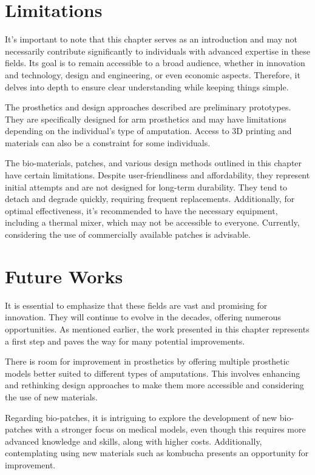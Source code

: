 \section{Limitations}
It's important to note that this chapter serves as an introduction and may not necessarily contribute significantly to individuals with advanced expertise in these fields. Its goal is to remain accessible to a broad audience, whether in innovation and technology, design and engineering, or even economic aspects. Therefore, it delves into depth to ensure clear understanding while keeping things simple. 

The prosthetics and design approaches described are preliminary prototypes. They are specifically designed for arm prosthetics and may have limitations depending on the individual's type of amputation. Access to 3D printing and materials can also be a constraint for some individuals.

The bio-materials, patches, and various design methods outlined in this chapter have certain limitations. Despite user-friendliness and affordability, they represent initial attempts and are not designed for long-term durability. They tend to detach and degrade quickly, requiring frequent replacements. Additionally, for optimal effectiveness, it's recommended to have the necessary equipment, including a thermal mixer, which may not be accessible to everyone. Currently, considering the use of commercially available patches is advisable.

\section{Future Works}
It is essential to emphasize that these fields are vast and promising for innovation. They will continue to evolve in the decades, offering numerous opportunities. As mentioned earlier, the work presented in this chapter represents a first step and paves the way for many potential improvements.

There is room for improvement in prosthetics by offering multiple prosthetic models better suited to different types of amputations. This involves enhancing and rethinking design approaches to make them more accessible and considering the use of new materials.

Regarding bio-patches, it is intriguing to explore the development of new bio-patches with a stronger focus on medical models, even though this requires more advanced knowledge and skills, along with higher costs. Additionally, contemplating using new materials such as kombucha presents an opportunity for improvement.

